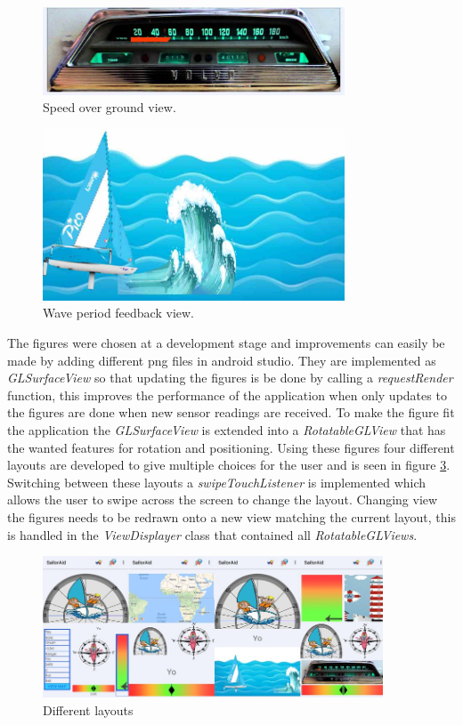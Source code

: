 \begin{figure}[H]
	\centering
	\includegraphics[width=0.8\textwidth]{Figures/sog.jpg}
	\caption{Speed over ground view.}
	\label{feedback-sog}
\end{figure}
\begin{figure}[H]
	\centering
	\includegraphics[width=0.8\textwidth]{Figures/wave.jpg}
	\caption{Wave period feedback view.}
	\label{feedback-wave}
\end{figure}
The figures were chosen at a development stage and improvements can easily be made by adding different \gls{png}\cite{png} files in android studio. They are implemented as \emph{GLSurfaceView}\cite{gl} so that updating the figures is be done by calling a \emph{requestRender} function, this improves the performance of the application when only updates to the figures are done when new sensor readings are received. To make the figure fit the application the \emph{GLSurfaceView} is extended into a \emph{RotatableGLView} that has the wanted features for rotation and positioning. Using these figures four different layouts are developed to give multiple choices for the user and is seen in figure \ref{feedback-layouts}. Switching between these layouts a \emph{swipeTouchListener} is implemented which allows the user to swipe across the screen to change the layout. Changing view the figures needs to be redrawn onto a new view matching the current layout, this is handled in the \emph{ViewDisplayer} class that contained all \emph{RotatableGLViews}.

\begin{figure}[H]
\centering
\includegraphics[width=0.9\textwidth]{Figures/layouts.jpg}
\caption{Different layouts}
\label{feedback-layouts}
\end{figure}


